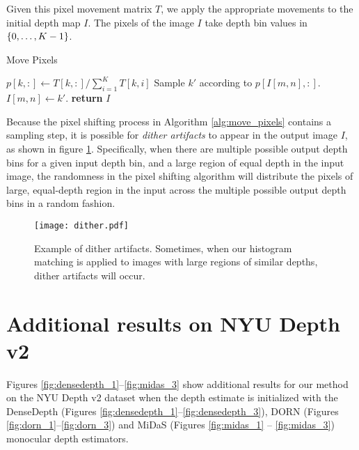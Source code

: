 \documentclass[runningheads]{llncs}
\begin{document}
Given this pixel movement matrix $T$, we apply the appropriate movements to the
initial depth map $I$. The pixels of the image $I$ take depth bin values in $\{0,\ldots,K-1\}$. 
{ \footnotesize
  \begin{algorithm}[H]
    \caption{Move Pixels}
    \label{alg:move_pixels}
    \begin{algorithmic}
      \footnotesize
        \State $p[k,:] \gets T[k,:]/\sum_{i=1}^K T[k,i]$
      \EndFor
          \State Sample $k'$ according to $p[I[m,n],:]$.
          \State $I[m,n] \gets k'$.
        \EndFor
      \EndFor
      \State \textbf{return} $I$
      \EndProcedure
    \end{algorithmic}
  \end{algorithm}
} Because the pixel shifting process in Algorithm \ref{alg:move_pixels} contains
a sampling step, it is possible for
\textit{dither artifacts} to appear in the output image $I$, as shown in figure
\ref{fig:dither}. Specifically, when there are multiple possible output depth
bins for a given input depth bin, and a large region of equal depth in the input
image, the randomness in the pixel shifting algorithm will distribute the pixels
of large, equal-depth region in the input across the multiple possible output
depth bins in a random fashion.

\begin{figure}[H]
  \centering \texttt{[image: dither.pdf]}
  \caption{Example of dither artifacts. Sometimes, when our histogram matching
    is applied to images with large regions of similar depths, dither artifacts
    will occur.}
  \label{fig:dither}
\end{figure}


\section{Additional results on NYU Depth v2}
Figures \ref{fig:densedepth_1}--\ref{fig:midas_3} show additional results
for our method on the NYU Depth v2 dataset when the depth estimate is
initialized with the DenseDepth \cite{Alhashim2018} (Figures
\ref{fig:densedepth_1}--\ref{fig:densedepth_3}), DORN \cite{Fu2018} (Figures
\ref{fig:dorn_1}--\ref{fig:dorn_3}) 
and MiDaS \cite{Lasinger:2019} (Figures \ref{fig:midas_1} -- \ref{fig:midas_3}) monocular depth estimators.
\end{document}
